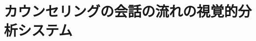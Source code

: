\documentclass[shuuron]{kuee}
\begin{document}



















\chapter{カウンセリングの会話の流れの視覚的分析システム} %
\end{document}

